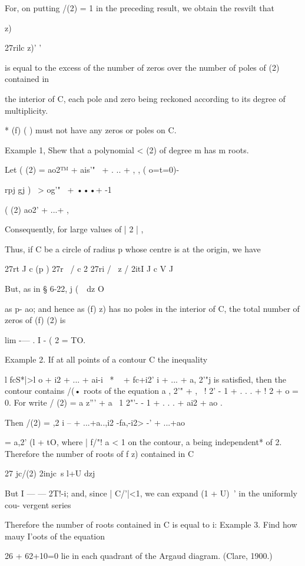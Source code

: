 For, on putting /(2) = 1 in the preceding result, we obtain the
resvilt that

z)

27rilc z)' '

is equal to the excess of the number of zeros over the number of poles
of (2) contained in

the interior of C, each pole and zero being reckoned according to its
degree of multiplicity.

* (f) ( ) must not have any zeros or poles on C.

%
%

Example 1, Shew that a polynomial < (2) of degree m has m roots.

Let ( (2) = ao2™ + ais'"~ + . .. + , , ( o=t=0)-

rpj gj ) \ > og'"~ + •••+ -1

( (2) ao2' + ...+ ,

Consequently, for large values of | 2 | ,

Thus, if C be a circle of radius p whose centre is at the origin, we
have

27rt J c (p ) 27r \ / c 2 27ri / \ z / 2itI J c V J

But, as in § 6-22, j (\ \ dz O

as p- ao; and hence as (f) z) has no poles in the interior of C, the
total number of zeros of (f) (2) is

lim -— . I - ( 2 = TO.

Example 2. If at all points of a contour C the inequality

l fcS*|>l o + i2 + ... + ai-i~ * ~ + fc+i2' i + ... + a, 2'"j is
satisfied, then the contour contains /(• roots of the equation a , 2'"
+ , \ ! 2' - 1 + . . . + ! 2 + o = 0. For write / (2) = a z''' + a \ 1
2"'- - 1 + . . . + ai2 + ao .

Then /(2) = ,2 i -- + ...+a..,i2 -fa,-i2> -' + ...+ao\

= a,2' (l + tO, where | f/"! a < 1 on the contour, a being
independent* of 2. Therefore the number of roots of f z) contained in
C

27 jc/(2) 2injc\ s l+U dzj

But I — — 2T!-i; and, since | C/'|<1, we can expand (1 + U)~' in the
uniformly cou- vergent series

Therefore the number of roots contained in C is equal to i: Example 3.
Find how mauy I'oots of the equation

26 + 62+10=0 lie in each quadrant of the Argaud diagram. (Clare,
1900.)

